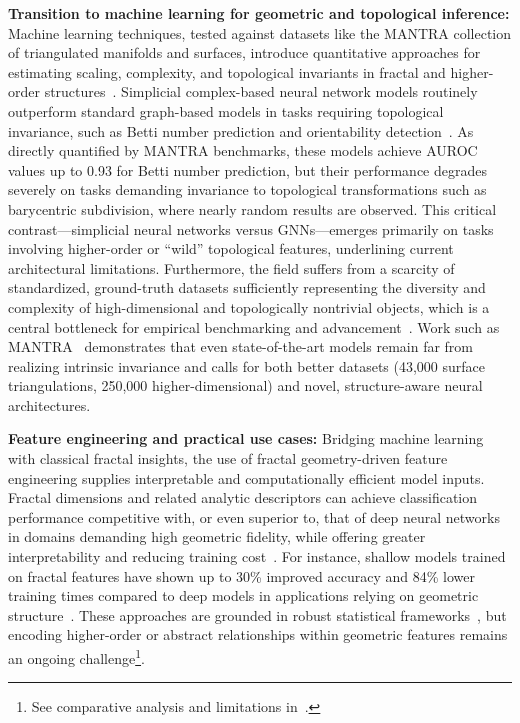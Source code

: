 \documentclass[sigconf]{acmart}
\begin{document}
\textbf{Transition to machine learning for geometric and topological inference:}
Machine learning techniques, tested against datasets like the MANTRA collection of triangulated manifolds and surfaces, introduce quantitative approaches for estimating scaling, complexity, and topological invariants in fractal and higher-order structures~\cite{ref26,ref39}. Simplicial complex-based neural network models routinely outperform standard graph-based models in tasks requiring topological invariance, such as Betti number prediction and orientability detection~\cite{ref26}. As directly quantified by MANTRA benchmarks, these models achieve AUROC values up to 0.93 for Betti number prediction, but their performance degrades severely on tasks demanding invariance to topological transformations such as barycentric subdivision, where nearly random results are observed. This critical contrast—simplicial neural networks versus GNNs—emerges primarily on tasks involving higher-order or ``wild'' topological features, underlining current architectural limitations. Furthermore, the field suffers from a scarcity of standardized, ground-truth datasets sufficiently representing the diversity and complexity of high-dimensional and topologically nontrivial objects, which is a central bottleneck for empirical benchmarking and advancement~\cite{ref26,ref39}. Work such as MANTRA~\cite{ref26} demonstrates that even state-of-the-art models remain far from realizing intrinsic invariance and calls for both better datasets (43,000 surface triangulations, 250,000 higher-dimensional) and novel, structure-aware neural architectures.

\textbf{Feature engineering and practical use cases:}
Bridging machine learning with classical fractal insights, the use of fractal geometry-driven feature engineering supplies interpretable and computationally efficient model inputs. Fractal dimensions and related analytic descriptors can achieve classification performance competitive with, or even superior to, that of deep neural networks in domains demanding high geometric fidelity, while offering greater interpretability and reducing training cost~\cite{ref26,ref39}. For instance, shallow models trained on fractal features have shown up to 30\% improved accuracy and 84\% lower training times compared to deep models in applications relying on geometric structure~\cite{ref39}. These approaches are grounded in robust statistical frameworks~\cite{ref30}, but encoding higher-order or abstract relationships within geometric features remains an ongoing challenge\footnote{See comparative analysis and limitations in~\cite{ref39}.}.
\end{document}
